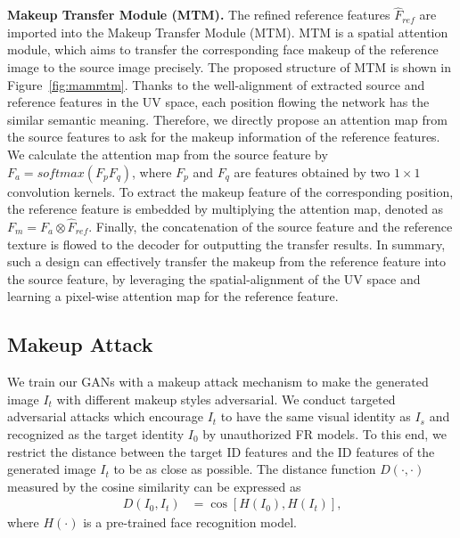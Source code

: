 \documentclass[10pt,journal,compsoc]{IEEEtran}
\begin{document}
{\bf Makeup Transfer Module (MTM).}
The refined reference features $\hat{F}_{ref}$ are imported into the Makeup Transfer Module (MTM). %
MTM is a spatial attention module, which aims to transfer the corresponding face makeup of the reference image to the source image precisely.
The proposed structure of MTM is shown in Figure~\ref{fig:mammtm}.
Thanks to the well-alignment of extracted source and reference features in the UV space, each position flowing the network has the similar semantic meaning. Therefore, we directly propose an attention map from the source features to ask for the makeup information of the reference features. 
We calculate the attention map from the source feature by $F_{a}= softmax(F_{p}F_{q})$, where $F_{p}$ and $F_{q}$ are features obtained by two $1 \times 1$ convolution kernels. 
To extract the makeup feature of the corresponding position, the reference feature is embedded by multiplying the attention map, denoted as $F_{m}=F_{a} \otimes \hat{F}_{ref}$. Finally, the concatenation of the source feature and the reference texture is flowed to the decoder for outputting the transfer results. 
In summary, such a design can effectively transfer the makeup from the reference feature into the source feature, by leveraging the spatial-alignment of the UV space and learning a pixel-wise attention map for the reference feature. 

\subsection{Makeup Attack}
\label{subsection:att}
We train our GANs with a makeup attack mechanism to make the generated image $I_t$ with different makeup styles adversarial. 
We conduct targeted adversarial attacks which encourage $I_t$ to have the same visual identity as $I_s$ and recognized as the target identity $I_0$ by unauthorized FR models. 
To this end, we restrict the distance between the target ID features and the ID features of the generated image $I_{t}$ to be as close as possible. 
The distance function $D(\cdot,\cdot)$ measured by the cosine similarity can be expressed as
\begin{equation}
	\begin{aligned}
	D(I_0, I_t) &=\cos \left[H(I_0), H(I_t)\right]\text{,}
	\end{aligned}
\end{equation}
where $H(\cdot)$ is a pre-trained face recognition model.
\end{document}
